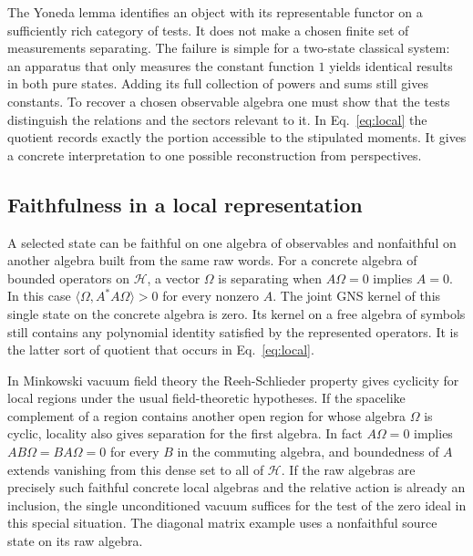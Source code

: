 \documentclass[11pt,letterpaper]{article}
\begin{document}
The Yoneda lemma identifies an object with its representable functor on a sufficiently rich category of tests. It does not make a chosen finite set of measurements separating. The failure is simple for a two-state classical system: an apparatus that only measures the constant function $1$ yields identical results in both pure states. Adding its full collection of powers and sums still gives constants. To recover a chosen observable algebra one must show that the tests distinguish the relations and the sectors relevant to it. In Eq.~\eqref{eq:local} the quotient records exactly the portion accessible to the stipulated moments. It gives a concrete interpretation to one possible reconstruction from perspectives.

\subsection{Faithfulness in a local representation}

A selected state can be faithful on one algebra of observables and nonfaithful on another algebra built from the same raw words. For a concrete algebra of bounded operators on $\mathcal H$, a vector $\Omega$ is separating when $A\Omega=0$ implies $A=0$. In this case $\langle\Omega,A^*A\Omega\rangle>0$ for every nonzero $A$. The joint GNS kernel of this single state on the concrete algebra is zero. Its kernel on a free algebra of symbols still contains any polynomial identity satisfied by the represented operators. It is the latter sort of quotient that occurs in Eq.~\eqref{eq:local}.

In Minkowski vacuum field theory the Reeh-Schlieder property gives cyclicity for local regions under the usual field-theoretic hypotheses. If the spacelike complement of a region contains another open region for whose algebra $\Omega$ is cyclic, locality also gives separation for the first algebra. In fact $A\Omega=0$ implies $AB\Omega=BA\Omega=0$ for every $B$ in the commuting algebra, and boundedness of $A$ extends vanishing from this dense set to all of $\mathcal H$. If the raw algebras are precisely such faithful concrete local algebras and the relative action is already an inclusion, the single unconditioned vacuum suffices for the test of the zero ideal in this special situation. The diagonal matrix example uses a nonfaithful source state on its raw algebra.
\end{document}
